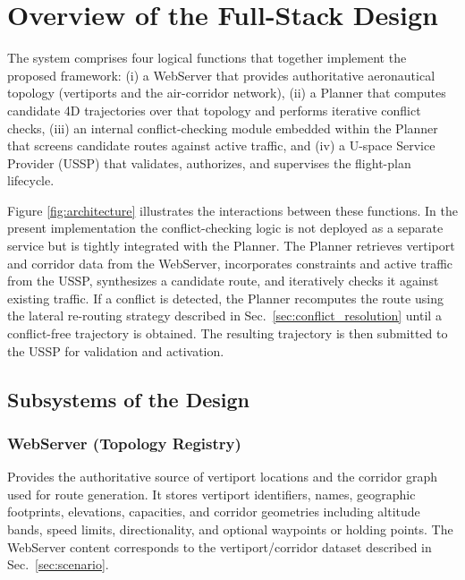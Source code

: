 \chapter{Overview of the Full-Stack Design}%
\label{s_architecture}

The system comprises four logical functions that together implement the proposed framework:
(i) a WebServer that provides authoritative aeronautical topology (vertiports and the air-corridor network),
(ii) a Planner that computes candidate 4D trajectories over that topology and performs iterative conflict checks,
(iii) an internal conflict-checking module embedded within the Planner that screens candidate routes against active traffic,
and (iv) a U-space Service Provider (USSP) that validates, authorizes, and supervises the flight-plan lifecycle.

Figure \ref{fig:architecture} illustrates the interactions between these functions.  
In the present implementation the conflict-checking logic is not deployed as a separate service but is tightly integrated with the Planner.
The Planner retrieves vertiport and corridor data from the WebServer, incorporates constraints and active traffic from the USSP,
synthesizes a candidate route, and iteratively checks it against existing traffic. If a conflict is detected, the Planner
recomputes the route using the lateral re-routing strategy described in Sec.~\ref{sec:conflict_resolution} until a conflict-free
trajectory is obtained. The resulting trajectory is then submitted to the USSP for validation and activation.

\section{Subsystems of the Design}%
\label{s_contribution}

\subsection*{WebServer (Topology Registry)}
Provides the authoritative source of vertiport locations and the corridor graph used for route generation.  
It stores vertiport identifiers, names, geographic footprints, elevations, capacities, and corridor geometries including
altitude bands, speed limits, directionality, and optional waypoints or holding points.  
The WebServer content corresponds to the vertiport/corridor dataset described in Sec.~\ref{sec:scenario}.


